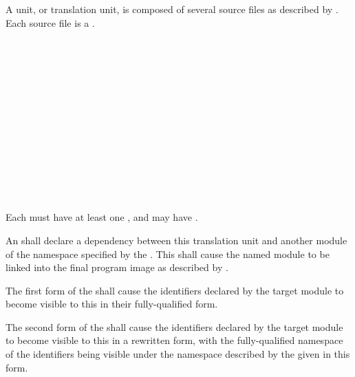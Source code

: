 
\specsubitem
A unit, or translation unit, is composed of several source files as described
by . Each source file is a .

\begin{grammar}
\\
	 \\

\\
	\\
	 \\

\\
	  \terminal{;}\\
	  \terminal{=}  \terminal{;}\\
	  \terminal{::} \terminal{\{}  \terminal{\}} \terminal{;}\\

\\
	 \optional{\terminal{,}}\\
	 \terminal{,} \\
\end{grammar}

\specsubitem
Each  must have at least one ,
and may have .

\specsubitem
An  shall declare a dependency between this translation
unit and another module of the namespace specified by the
 . This shall cause the named
module to be linked into the final program image as described by
.

\specsubitem
The first form of the  shall cause the identifiers
declared by the target module to become visible to this 
in their fully-qualified form.

\specsubitem
The second form of the  shall cause the identifiers
declared by the target module to become visible to this 
in a rewritten form, with the fully-qualified namespace of the identifiers
being visible under the namespace described by the  given in
this form.

